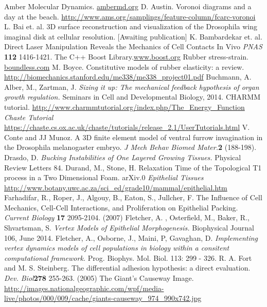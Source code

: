 \begin{thebibliography}{1}
 Amber Molecular Dynamics. \url{ambermd.org}
 D. Austin. Voronoi diagrams and a day at the beach. \url{http://www.ams.org/samplings/feature-column/fcarc-voronoi}
 L. Bai et. al. 3D surface reconstruction and visualization of the Drosophila wing imaginal disk at cellular resolution. [Awaiting publication]
 K. Bambardekar et. al. Direct Laser Manipulation Reveals the Mechanics of Cell Contacts In Vivo \emph{PNAS} \textbf{112} 1416-1421.
The C++ Boost Library.\url{www.boost.org}
 Rubber stress-strain. \url{boundless.com}
 M. Boyce. Constitutive models of rubber elasticity: a review. \url{http://biomechanics.stanford.edu/me338/me338_project01.pdf}
 Buchmann, A. Alber, M., Zartman, J. \emph{ Sizing it up: The mechanical feedback hypothesis of organ growth regulation.} Seminars in Cell and Developmental Biology, 2014.
 CHARMM tutorial. \url{http://www.charmmtutorial.org/index.php/The_Energy_Function}
 \emph{Chaste Tutorial} \url{https://chaste.cs.ox.ac.uk/chaste/tutorials/release_2.1/UserTutorials.html}
V. Conte and JJ Munoz. A 3D finite element model of ventral furrow invagination in the Drosophila melanogaster embryo. \emph{J Mech Behav Biomed Mater.}\textbf{2} (188-198).
 Drasdo, D. \emph{Bucking Instabilities of One Layered Growing Tissues.} Physical Review Letters 84.
 Durand, M., Stone, H. Relaxation Time of the Topological T1 process in a Two Dimensional Foam. arXiv.0
\emph{Epithelial Tissues} \url{http://www.botany.uwc.ac.za/sci_ed/grade10/mammal/epithelial.htm}
 Farhadifar, R., Roper, J., Algouy, B., Eaton, S., Jullcher, F. The Influence of Cell Mechanics, Cell-Cell Interactions, and Proliferation on Epithelial Packing. \emph{Current Biology} \textbf{17} 2095-2104. (2007) 
 Fletcher, A. , Osterfield, M., Baker, R., Shvartsman, S. \emph{Vertex Models of Epithelial Morphogenesis.} Biophysical Journal 106, June 2014.
 Fletcher, A., Osborne, J., Maini, P, Gavaghan, D. \emph{Implementing vertex dynamics models of cell populations in biology within a consitent computational framework.} Prog. Biophys. Mol. Biol. 113: 299 - 326.
 R. A. Fort and M. S. Steinberg. The differential adhesion hypothesis: a direct evaluation. \emph{Dev. Biol}\textbf{278} 255-263. (2005)
 The Giant's Causeway Image. \url{http://images.nationalgeographic.com/wpf/media-live/photos/000/009/cache/giants-causeway_974_990x742.jpg}

\end{thebibliography}
